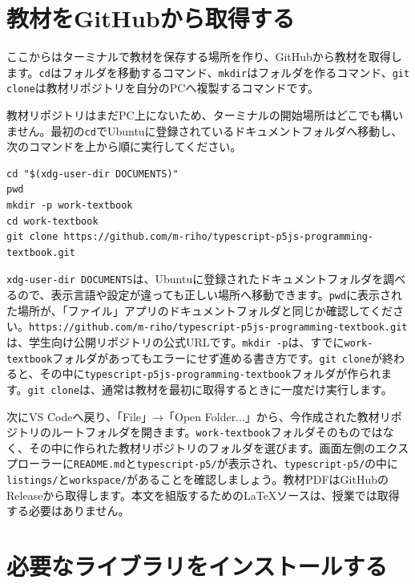 \section{教材をGitHubから取得する}

ここからはターミナルで教材を保存する場所を作り、GitHubから教材を取得します。\texttt{cd}はフォルダを移動するコマンド、\texttt{mkdir}はフォルダを作るコマンド、\texttt{git clone}は教材リポジトリを自分のPCへ複製するコマンドです。

教材リポジトリはまだPC上にないため、ターミナルの開始場所はどこでも構いません。最初の\texttt{cd}でUbuntuに登録されているドキュメントフォルダへ移動し、次のコマンドを上から順に実行してください。

\begin{listing}[htbp]
\begin{verbatim}
cd "$(xdg-user-dir DOCUMENTS)"
pwd
mkdir -p work-textbook
cd work-textbook
git clone https://github.com/m-riho/typescript-p5js-programming-textbook.git
\end{verbatim}
\caption{教材を保存するフォルダを作成してリポジトリを取得するコマンド}
\label{lst:appendix-ubuntu-git-clone}
\end{listing}

\texttt{xdg-user-dir DOCUMENTS}は、Ubuntuに登録されたドキュメントフォルダを調べるので、表示言語や設定が違っても正しい場所へ移動できます。\texttt{pwd}に表示された場所が、「ファイル」アプリのドキュメントフォルダと同じか確認してください。\texttt{https://github.com/m-riho/typescript-p5js-programming-textbook.git}は、学生向け公開リポジトリの公式URLです。\texttt{mkdir -p}は、すでに\texttt{work-textbook}フォルダがあってもエラーにせず進める書き方です。\texttt{git clone}が終わると、その中に\texttt{typescript-p5js-programming-textbook}フォルダが作られます。\texttt{git clone}は、通常は教材を最初に取得するときに一度だけ実行します。

次にVS Codeへ戻り、「File」→「Open Folder...」から、今作成された教材リポジトリのルートフォルダを開きます。\texttt{work-textbook}フォルダそのものではなく、その中に作られた教材リポジトリのフォルダを選びます。画面左側のエクスプローラーに\texttt{README.md}と\texttt{typescript-p5/}が表示され、\texttt{typescript-p5/}の中に\texttt{listings/}と\texttt{workspace/}があることを確認しましょう。教材PDFはGitHubのReleaseから取得します。本文を組版するためのLaTeXソースは、授業では取得する必要はありません。

\section{必要なライブラリをインストールする}

